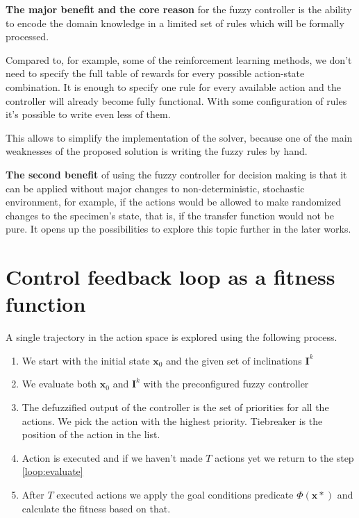 \documentclass[12pt, a4paper]{report}
\begin{document}
	\textbf{The major benefit and the core reason} for the fuzzy controller is the ability to encode the domain knowledge in a limited set of rules which will be formally processed.

	Compared to, for example, some of the reinforcement learning methods, we don't need to specify the full table of rewards for every possible action-state combination.
	It is enough to specify one rule for every available action and the controller will already become fully functional.
	With some configuration of rules it's possible to write even less of them.

	This allows to simplify the implementation of the solver, because one of the main weaknesses of the proposed solution is writing the fuzzy rules by hand.

  \textbf{The second benefit} of using the fuzzy controller for decision making is that it can be applied without major changes to non-deterministic, stochastic environment,
  for example, if the actions would be allowed to make randomized changes to the specimen's state, that is, if the transfer function would not be pure.
  It opens up the possibilities to explore this topic further in the later works.

	\section{Control feedback loop as a fitness function}\label{fitness}

	A single trajectory in the action space is explored using the following process.

	\begin{enumerate}
		\item We start with the initial state $\mathbf{x}_0$ and the given set of inclinations $\mathbf{I}^k$
		\item\label{loop:evaluate} We evaluate both $\mathbf{x}_0$ and $\mathbf{I}^k$ with the preconfigured fuzzy controller
		\item The defuzzified output of the controller is the set of priorities for all the  actions. We pick the action with the highest priority. Tiebreaker is the position of the action in the list.
		\item Action is executed and if we haven't made $T$ actions yet we return to the step \ref{loop:evaluate}
		\item After $T$ executed actions we apply the goal conditions predicate $\Phi(\mathbf{x}*)$ and calculate the fitness based on that.
	\end{enumerate}
\end{document}
